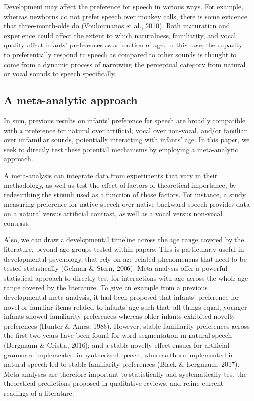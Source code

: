 \documentclass[
  man]{apa6}
\begin{document}
Development may affect the preference for speech in various ways. For example, whereas newborns do not prefer speech over monkey calls, there is some evidence that three-month-olds do (Vouloumanos et al., 2010). Both maturation and experience could affect the extent to which naturalness, familiarity, and vocal quality affect infants' preferences as a function of age. In this case, the capacity to preferentially respond to speech as compared to other sounds is thought to come from a dynamic process of narrowing the perceptual category from natural or vocal sounds to speech specifically.

\hypertarget{a-meta-analytic-approach}{%
\subsection{A meta-analytic approach}\label{a-meta-analytic-approach}}

In sum, previous results on infants' preference for speech are broadly compatible with a preference for natural over artificial, vocal over non-vocal, and/or familiar over unfamiliar sounds, potentially interacting with infants' age. In this paper, we seek to directly test these potential mechanisms by employing a meta-analytic approach.

A meta-analysis can integrate data from experiments that vary in their methodology, as well as test the effect of factors of theoretical importance, by redescribing the stimuli used as a function of those factors. For instance, a study measuring preference for native speech over native backward speech provides data on a natural versus artificial contrast, as well as a vocal versus non-vocal contrast.

Also, we can draw a developmental timeline across the age range covered by the literature, beyond age groups tested within papers. This is particularly useful in developmental psychology, that rely on age-related phenomenons that need to be tested statistically (Gelman \& Stern, 2006). Meta-analysis offer a powerful statistical approach to directly test for interactions with age across the whole age-range covered by the literature. To give an example from a previous developmental meta-analysis, it had been proposed that infants' preference for novel or familiar items related to infants' age such that, all things equal, younger infants showed familiarity preferences whereas older infants exhibited novelty preferences (Hunter \& Ames, 1988). However, stable familiarity preferences across the first two years have been found for word segmentation in natural speech (Bergmann \& Cristia, 2016); and a stable novelty effect ensues for artificial grammars implemented in synthesized speech, whereas those implemented in natural speech led to stable familiarity preferences (Black \& Bergmann, 2017). Meta-analyses are therefore important to statistically and systematically test the theoretical predictions proposed in qualitative reviews, and refine current readings of a literature.
\end{document}
